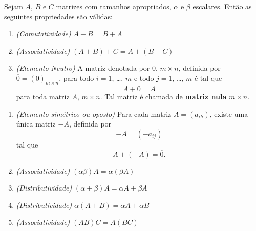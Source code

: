 \documentclass{beamer}
\begin{document}
  \begin{frame}
   \begin{teorema}
      Sejam $A$, $B$ e $C$ matrizes com tamanhos apropriados, $\alpha$ e $\beta$ escalares. Então as seguintes propriedades são válidas:
      \begin{enumerate}[label={\arabic*})]
        \item \textit{(Comutatividade)} $A + B = B + A$

        \item \textit{(Associatividade)} $(A + B) + C = A + (B + C)$

        \item \textit{(Elemento Neutro)} A matriz denotada por $\overline{0}$, $m \times n$, definida por $\overline{0} = (0)_{m \times n}$, para todo $i = 1$, \dots, $m$ 
        e todo $j = 1$, \dots, $m$ é tal que
        \[ 
          A + \overline{0} = A
        \]
        para toda matriz $A$, $m \times n$. Tal matriz é chamada de \textbf{matriz nula} $m \times n$.
        \seti
      \end{enumerate}
    \end{teorema}
  \end{frame}

  \begin{frame}
    \begin{teorema}
      \begin{enumerate}[label={\arabic*)}]
        \conti

        \item \textit{(Elemento simétrico ou oposto)} Para cada matriz $A = (a_{ih})$, existe uma única matriz $-A$, definida por
          \[ -A = (-a_{ij})\]
        tal que
        \[ A + (-A) = \overline{0}.\]

        \item \textit{(Associatividade)} $(\alpha\beta)A = \alpha(\beta A)$

        \item \textit{(Distributividade)} $(\alpha + \beta)A = \alpha A + \beta A$

        \item \textit{(Distributividade)} $\alpha(A + B) = \alpha A + \alpha B$

        \item \textit{(Associatividade)} $(AB)C = A(BC)$
        \seti
      \end{enumerate}
    \end{teorema}
  \end{frame}
\end{document}
